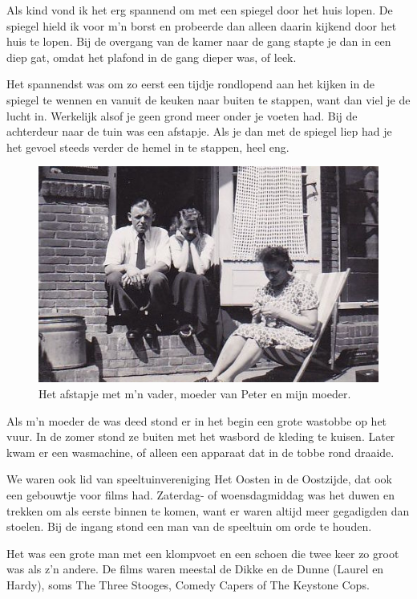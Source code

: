 \documentclass[10pt,twoside, openright]{memoir}
\begin{document}
Als kind vond ik het erg spannend om met een spiegel door het huis lopen. De spiegel hield ik voor m’n borst en probeerde dan alleen daarin kijkend door het huis te lopen. Bij de overgang van de kamer naar de gang stapte je dan in een diep gat, omdat het plafond in de gang dieper was, of leek. 

Het spannendst was om zo eerst een tijdje rondlopend aan het kijken in de spiegel te wennen en vanuit de keuken naar buiten te stappen, want dan viel je de lucht in. Werkelijk alsof je geen grond meer onder je voeten had. Bij de achterdeur naar de tuin was een afstapje. Als je dan met de spiegel liep had je het gevoel steeds verder de hemel in te stappen, heel eng. 

\begin{figure}
\includegraphics[width=\textwidth]{img/ch5/gevonden_0009}
\caption*{\footnotesize Het afstapje met m’n vader, moeder van Peter en mijn moeder.}
\end{figure}

Als m’n moeder de was deed stond er in het begin een grote wastobbe op het vuur. In de zomer stond ze buiten met het wasbord de kleding te kuisen. Later kwam er een wasmachine, of alleen een apparaat dat in de tobbe rond draaide. 

We waren ook lid van speeltuinvereniging Het Oosten in de Oostzijde, dat ook een gebouwtje voor films had. Zaterdag- of woensdagmiddag was het duwen en trekken om als eerste binnen te komen, want er waren altijd meer gegadigden dan stoelen. Bij de ingang stond een man van de speeltuin om orde te houden. 

Het was een grote man met een klompvoet en een schoen die twee keer zo groot was als z’n andere. De films waren meestal de Dikke en de Dunne (Laurel en Hardy), soms The Three Stooges, Comedy Capers of The Keystone Cops. 
\end{document}
